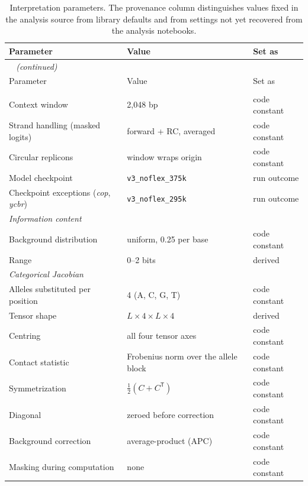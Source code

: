 {\small
\begin{longtable}{p{}p{}p{}}
\caption{
Interpretation parameters. The provenance column distinguishes values fixed in the analysis source from library defaults and from settings not yet recovered from the analysis notebooks.
}\label{tab:supp-interp-params}\\
\toprule
Parameter & Value & Set as \\
\midrule
\endfirsthead
\multicolumn{3}{l}{\emph{\tablename~\thetable{} (continued)}}\\
\toprule
Parameter & Value & Set as \\
\midrule
\endhead
\bottomrule
\endfoot
\multicolumn{3}{l}{\textit{Inference}} \\
Context window & 2,048 bp & code constant \\
Strand handling (masked logits) & forward + RC, averaged & code constant \\
Circular replicons & window wraps origin & code constant \\
Model checkpoint & \texttt{v3\_noflex\_375k} & run outcome \\
Checkpoint exceptions (\emph{cop}, \emph{ycbr}) & \texttt{v3\_noflex\_295k} & run outcome \\
\midrule
\multicolumn{3}{l}{\textit{Information content}} \\
Background distribution & uniform, 0.25 per base & code constant \\
Range & 0--2 bits & derived \\
\midrule
\multicolumn{3}{l}{\textit{Categorical Jacobian}} \\
Alleles substituted per position & 4 (A, C, G, T) & code constant \\
Tensor shape & $L \times 4 \times L \times 4$ & derived \\
Centring & all four tensor axes & code constant \\
Contact statistic & Frobenius norm over the allele block & code constant \\
Symmetrization & $\tfrac{1}{2}(C + C^{\mathsf{T}})$ & code constant \\
Diagonal & zeroed before correction & code constant \\
Background correction & average-product (APC) & code constant \\
Masking during computation & none & code constant \\

\end{longtable}}
